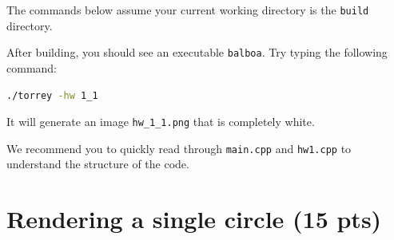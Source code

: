 The commands below assume your current working directory is the \lstinline{build} directory.

After building, you should see an executable \lstinline{balboa}. Try typing the following command:
\begin{lstlisting}[language=bash]
  ./torrey -hw 1_1
\end{lstlisting}
It will generate an image \lstinline{hw_1_1.png} that is completely white.

We recommend you to quickly read through \lstinline{main.cpp} and \lstinline{hw1.cpp} to understand the structure of the code.

\section{Rendering a single circle (15 pts)}

